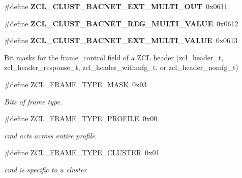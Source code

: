 \begin{DoxyCompactItemize}
\#define {\bfseries Z\+C\+L\+\_\+\+C\+L\+U\+S\+T\+\_\+\+B\+A\+C\+N\+E\+T\+\_\+\+E\+X\+T\+\_\+\+M\+U\+L\+T\+I\+\_\+\+O\+UT}~0x0611
\item 
\mbox{\label{group__zcl_ga15f9c19ffa747c96928e35dbb1ae871e}} 
\#define {\bfseries Z\+C\+L\+\_\+\+C\+L\+U\+S\+T\+\_\+\+B\+A\+C\+N\+E\+T\+\_\+\+R\+E\+G\+\_\+\+M\+U\+L\+T\+I\+\_\+\+V\+A\+L\+UE}~0x0612
\item 
\mbox{\label{group__zcl_ga81f7df07e9322e17d24501a9b7eeb0b6}} 
\#define {\bfseries Z\+C\+L\+\_\+\+C\+L\+U\+S\+T\+\_\+\+B\+A\+C\+N\+E\+T\+\_\+\+E\+X\+T\+\_\+\+M\+U\+L\+T\+I\+\_\+\+V\+A\+L\+UE}~0x0613
\end{DoxyCompactItemize}
\label{_amgrp01747264fe7bf50731df0522c351974e}%
Bit masks for the frame\+\_\+control field of a Z\+CL header (zcl\+\_\+header\+\_\+t, zcl\+\_\+header\+\_\+response\+\_\+t, zcl\+\_\+header\+\_\+withmfg\+\_\+t, or zcl\+\_\+header\+\_\+nomfg\+\_\+t) \begin{DoxyCompactItemize}
\item 
\mbox{\label{group__zcl_gad2e6a61d29cd303e906699a49fa2eb8e}} 
\#define \hyperlink{group__zcl_gad2e6a61d29cd303e906699a49fa2eb8e}{Z\+C\+L\+\_\+\+F\+R\+A\+M\+E\+\_\+\+T\+Y\+P\+E\+\_\+\+M\+A\+SK}~0x03
\begin{DoxyCompactList}\small\item\em Bits of frame type. \end{DoxyCompactList}\item 
\mbox{\label{group__zcl_ga332a452ea08eb67a3ebf962320bf8819}} 
\#define \hyperlink{group__zcl_ga332a452ea08eb67a3ebf962320bf8819}{Z\+C\+L\+\_\+\+F\+R\+A\+M\+E\+\_\+\+T\+Y\+P\+E\+\_\+\+P\+R\+O\+F\+I\+LE}~0x00
\begin{DoxyCompactList}\small\item\em cmd acts across entire profile \end{DoxyCompactList}\item 
\mbox{\label{group__zcl_ga75efeedff171558e183dbf8d646ea5dd}} 
\#define \hyperlink{group__zcl_ga75efeedff171558e183dbf8d646ea5dd}{Z\+C\+L\+\_\+\+F\+R\+A\+M\+E\+\_\+\+T\+Y\+P\+E\+\_\+\+C\+L\+U\+S\+T\+ER}~0x01
\begin{DoxyCompactList}\small\item\em cmd is specific to a cluster \end{DoxyCompactList}\item 

\end{DoxyCompactItemize}
